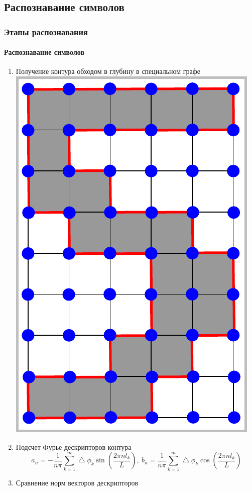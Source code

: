\subsection{Распознавание символов}

\begin{frame}
  \frametitle{Этапы распознавания}
  \framesubtitle{Распознавание символов}

  \begin{enumerate}
    \item Получение контура обходом в глубину в специальном графе
      \includegraphics[scale=0.3]{media/five.pdf}
    \item Подсчет Фурье дескрипторов контура
      \[
  a_n = -\frac{1}{n\pi}\sum_{k=1}^{m}\bigtriangleup\phi_k\sin(\frac{2\pi n l_k}{L}),~
  b_n = \frac{1}{n\pi}\sum_{k=1}^{m}\bigtriangleup\phi_k\cos(\frac{2\pi n l_k}{L})
\]
\item Сравнение норм векторов дескрипторов 
  \end{enumerate}
\end{frame}

